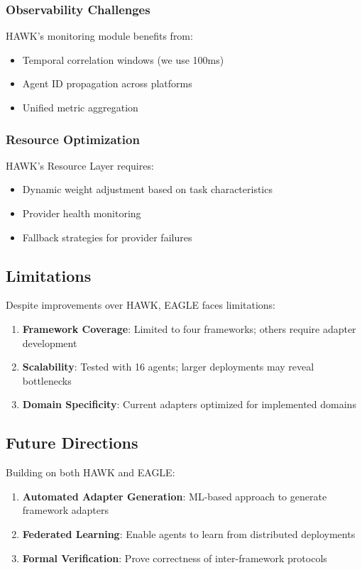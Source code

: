 \documentclass[conference]{IEEEtran}
\begin{document}
\subsubsection{Observability Challenges}
HAWK's monitoring module benefits from:
\begin{itemize}
    \item Temporal correlation windows (we use 100ms)
    \item Agent ID propagation across platforms
    \item Unified metric aggregation
\end{itemize}

\subsubsection{Resource Optimization}
HAWK's Resource Layer requires:
\begin{itemize}
    \item Dynamic weight adjustment based on task characteristics
    \item Provider health monitoring
    \item Fallback strategies for provider failures
\end{itemize}

\subsection{Limitations}

Despite improvements over HAWK, EAGLE faces limitations:

\begin{enumerate}
    \item \textbf{Framework Coverage}: Limited to four frameworks; others require adapter development
    \item \textbf{Scalability}: Tested with 16 agents; larger deployments may reveal bottlenecks
    \item \textbf{Domain Specificity}: Current adapters optimized for implemented domains
\end{enumerate}

\subsection{Future Directions}

Building on both HAWK and EAGLE:

\begin{enumerate}
    \item \textbf{Automated Adapter Generation}: ML-based approach to generate framework adapters
    \item \textbf{Federated Learning}: Enable agents to learn from distributed deployments
    \item \textbf{Formal Verification}: Prove correctness of inter-framework protocols
\end{enumerate}
\end{document}
